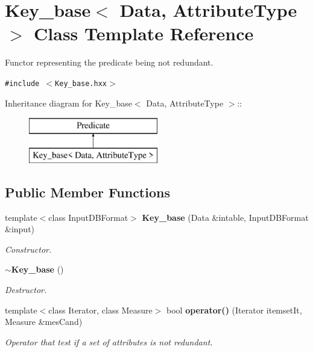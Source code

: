 \section{Key\_\-base$<$ Data, Attribute\-Type $>$ Class Template Reference}
\label{class_key__base}
Functor representing the predicate being not redundant.  


{\tt \#include $<$Key\_\-base.hxx$>$}

Inheritance diagram for Key\_\-base$<$ Data, Attribute\-Type $>$::\begin{figure}[H]
\begin{center}
\leavevmode
\includegraphics[height=2cm]{class_key__base}
\end{center}
\end{figure}
\subsection*{Public Member Functions}
\begin{CompactItemize}
\item 
template$<$class Input\-DBFormat$>$ {\bf Key\_\-base} (Data \&intable, Input\-DBFormat \&input)\label{class_key__base_f8742868c86280f7f169552d9e2d36fe}

\begin{CompactList}\small\item\em Constructor. \item\end{CompactList}\item 
{\bf $\sim$Key\_\-base} ()\label{class_key__base_8fd75950feb99c6c29008354d893d39c}

\begin{CompactList}\small\item\em Destructor. \item\end{CompactList}\item 
template$<$class Iterator, class Measure$>$ bool {\bf operator()} (Iterator itemset\-It, Measure \&mes\-Cand)
\begin{CompactList}\small\item\em Operator that test if a set of attributes is not redundant. \item\end{CompactList}\end{CompactItemize}
